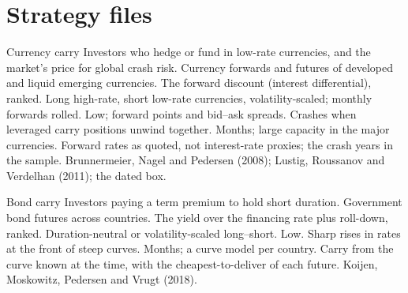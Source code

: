 \begin{omfigure}

\label{fig:s1:carry-across-asset-classes:wti}
\end{omfigure}

\section{Strategy files}

\begin{strategyfile}{Currency carry}\label{strat:s1:carry-across-asset-classes:fx}
 Investors who hedge or fund in low-rate currencies, and the market's price for global crash risk.
 Currency forwards and futures of developed and liquid emerging currencies.
 The forward discount (interest differential), ranked.
 Long high-rate, short low-rate currencies, volatility-scaled; monthly forwards rolled.
 Low; forward points and bid--ask spreads.
 Crashes when leveraged carry positions unwind together.
 Months; large capacity in the major currencies.
 Forward rates as quoted, not interest-rate proxies; the crash years in the sample.
 Brunnermeier, Nagel and Pedersen (2008); Lustig, Roussanov and Verdelhan (2011); the dated box.
\end{strategyfile}

\begin{strategyfile}{Bond carry}\label{strat:s1:carry-across-asset-classes:bond}
 Investors paying a term premium to hold short duration.
 Government bond futures across countries.
 The yield over the financing rate plus roll-down, ranked.
 Duration-neutral or volatility-scaled long--short.
 Low.
 Sharp rises in rates at the front of steep curves.
 Months; a curve model per country.
 Carry from the curve known at the time, with the cheapest-to-deliver of each future.
 Koijen, Moskowitz, Pedersen and Vrugt (2018).
\end{strategyfile}

